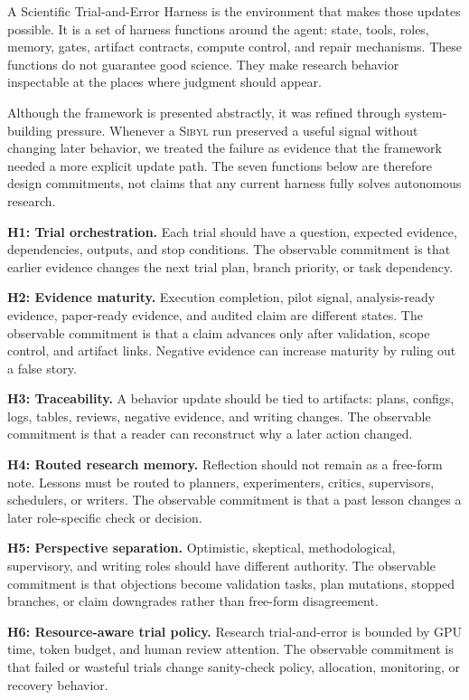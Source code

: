 \documentclass{article}
\newcommand{\sibyl}{\textsc{Sibyl}}
\begin{document}
A Scientific Trial-and-Error Harness is the environment that makes those updates possible. It is a set of harness functions around the agent: state, tools, roles, memory, gates, artifact contracts, compute control, and repair mechanisms. These functions do not guarantee good science. They make research behavior inspectable at the places where judgment should appear.

Although the framework is presented abstractly, it was refined through system-building pressure. Whenever a \sibyl{} run preserved a useful signal without changing later behavior, we treated the failure as evidence that the framework needed a more explicit update path. The seven functions below are therefore design commitments, not claims that any current harness fully solves autonomous research.

\textbf{H1: Trial orchestration.}
Each trial should have a question, expected evidence, dependencies, outputs, and stop conditions. The observable commitment is that earlier evidence changes the next trial plan, branch priority, or task dependency.

\textbf{H2: Evidence maturity.}
Execution completion, pilot signal, analysis-ready evidence, paper-ready evidence, and audited claim are different states. The observable commitment is that a claim advances only after validation, scope control, and artifact links. Negative evidence can increase maturity by ruling out a false story.

\textbf{H3: Traceability.}
A behavior update should be tied to artifacts: plans, configs, logs, tables, reviews, negative evidence, and writing changes. The observable commitment is that a reader can reconstruct why a later action changed.

\textbf{H4: Routed research memory.}
Reflection should not remain as a free-form note. Lessons must be routed to planners, experimenters, critics, supervisors, schedulers, or writers. The observable commitment is that a past lesson changes a later role-specific check or decision.

\textbf{H5: Perspective separation.}
Optimistic, skeptical, methodological, supervisory, and writing roles should have different authority. The observable commitment is that objections become validation tasks, plan mutations, stopped branches, or claim downgrades rather than free-form disagreement.

\textbf{H6: Resource-aware trial policy.}
Research trial-and-error is bounded by GPU time, token budget, and human review attention. The observable commitment is that failed or wasteful trials change sanity-check policy, allocation, monitoring, or recovery behavior.
\end{document}
